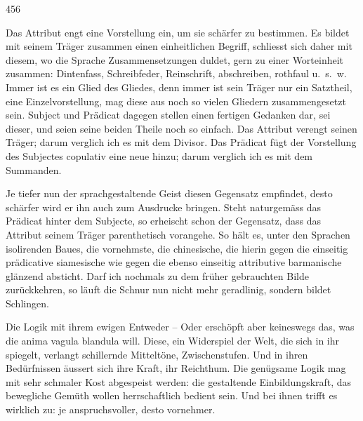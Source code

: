 {\textbar}{\textbar}456{\textbar}{\textbar}\label{sp.456}


Das Attribut engt eine Vorstellung ein, um sie schärfer zu bestimmen. Es bildet mit seinem Träger zusammen einen einheitlichen Begriff, schliesst sich daher mit diesem, wo die Sprache Zusammensetzungen duldet, gern zu einer Worteinheit zusammen: Dintenfass, Schreibfeder, Reinschrift, abschreiben, rothfaul u.~s.~w. Immer ist es ein Glied des Gliedes, denn immer ist sein Träger nur ein Satztheil, eine Einzelvorstellung, mag diese aus noch so vielen Gliedern zusammen\label{fp.436}gesetzt sein. Subject und Prädicat dagegen stellen einen fertigen Gedanken dar, sei dieser, und seien seine beiden Theile noch so einfach. Das Attribut verengt seinen Träger; darum verglich ich es mit dem Divisor. Das Prädicat fügt der Vorstellung des Subjectes copulativ eine neue hinzu; darum verglich ich es mit dem Summanden.

Je tiefer nun der sprachgestaltende Geist diesen Gegensatz empfindet, desto schärfer wird er ihn auch zum Ausdrucke bringen. Steht naturgemäss das Prädicat hinter dem Subjecte, so erheischt schon der Gegensatz, dass das Attribut seinem Träger parenthetisch vorangehe. So hält es, unter den Sprachen isolirenden Baues, die vornehmste, die chinesische, die hierin gegen die einseitig prädicative siamesische wie gegen die ebenso einseitig attributive barmanische glänzend absticht. Darf ich nochmals zu dem früher gebrauchten Bilde zurückkehren, so läuft die Schnur nun nicht mehr geradlinig, sondern bildet Schlingen.

Die Logik mit ihrem ewigen Entweder – Oder erschöpft aber keineswegs das, was die anima vagula blandula will. Diese, ein Widerspiel der Welt, die sich in ihr spiegelt, verlangt schillernde Mitteltöne, Zwischenstufen. Und in ihren Bedürfnissen äussert sich ihre Kraft, ihr Reichthum. Die genügsame Logik mag mit sehr schmaler Kost abgespeist werden: die gestaltende Einbildungskraft, das bewegliche Gemüth wollen herrschaftlich bedient sein. Und bei ihnen trifft es wirklich zu: je anspruchsvoller, desto vornehmer.

